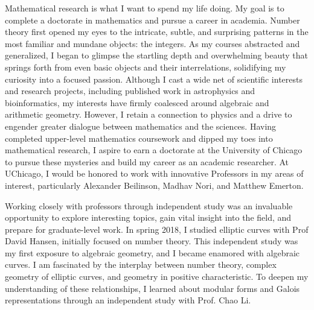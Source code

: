 \documentclass[11pt]{article}
\begin{document}
Mathematical research is what I want to spend my life doing. My goal is to complete a doctorate in mathematics and pursue a career in academia. Number theory first opened my eyes to the intricate, subtle, and surprising patterns in the most familiar and mundane objects: the integers. As my courses abstracted and generalized, I began to glimpse the startling depth and overwhelming beauty that springs forth from even basic objects and their interrelations, solidifying my curiosity into a focused passion. Although I cast a wide net of scientific interests and research projects, including published work in astrophysics and bioinformatics, my interests have firmly coalesced around algebraic and arithmetic geometry. However, I retain a connection to physics and a drive to engender greater dialogue between mathematics and the sciences. Having completed upper-level mathematics coursework and dipped my toes into mathematical research, I aspire to earn a doctorate at the University of Chicago to pursue these mysteries and build my career as an academic researcher. At UChicago, I would be honored to work with innovative Professors in my areas of interest, particularly Alexander Beilinson, Madhav Nori, and Matthew Emerton. 
\par
Working closely with professors through independent study was an invaluable opportunity to explore interesting topics, gain vital insight into the field, and prepare for graduate-level work. In spring 2018, I studied elliptic curves with Prof David Hansen, initially focused on number theory. This independent study was my first exposure to algebraic geometry, and I became enamored with algebraic curves. I am fascinated by the interplay between number theory, complex geometry of elliptic curves, and geometry in positive characteristic. To deepen my understanding of these relationships, I learned about modular forms and Galois representations through an independent study with Prof. Chao Li. 
\par
\end{document}
